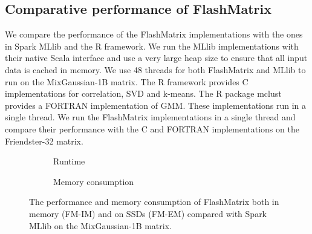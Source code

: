 \subsection{Comparative performance of FlashMatrix}

We compare the performance of the FlashMatrix implementations with the ones in
Spark MLlib \cite{mllib} and the R framework. We run the MLlib implementations
with their native Scala interface and use a very large heap size to ensure that
all input data is cached in memory. We use 48 threads for both FlashMatrix and
MLlib to run on the MixGaussian-1B matrix.
The R framework provides C implementations for correlation, SVD and k-means.
The R package mclust \cite{mclust} provides a FORTRAN implementation of GMM.
These implementations run in a single thread. We run the FlashMatrix
implementations in a single thread and compare their performance with the C and
FORTRAN implementations on the Friendster-32 matrix.

\begin{figure}
	\centering
	\footnotesize
	\vspace{-15pt}
	\begin{subfigure}{.5\textwidth}
		
		\label{perf:rt}
		\vspace{-15pt}
		\caption{Runtime}
	\end{subfigure}

	\begin{subfigure}{.5\textwidth}
		
		\label{perf:mem}
		\vspace{-15pt}
		\caption{Memory consumption}
	\end{subfigure}
	\caption{The performance and memory consumption of FlashMatrix both
		in memory (FM-IM) and on SSDs (FM-EM) compared with Spark MLlib
		on the MixGaussian-1B matrix.}
	\label{perf:fm}
\end{figure}

%		

